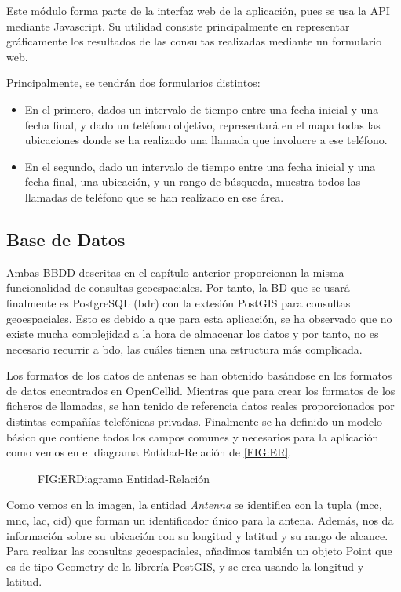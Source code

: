     Este módulo forma parte de la interfaz web de la aplicación, pues se usa la API mediante Javascript. Su utilidad consiste principalmente en representar gráficamente los resultados de las consultas realizadas mediante un formulario web.
    
    Principalmente, se tendrán dos formularios distintos:
    \begin{itemize}
      \item En el primero, dados un intervalo de tiempo entre una fecha inicial y una fecha final, y dado un teléfono objetivo, representará en el mapa todas las ubicaciones donde se ha realizado una llamada que involucre a ese teléfono.
      
      \item En el segundo, dado un intervalo de tiempo entre una fecha inicial y una fecha final, una ubicación, y un rango de búsqueda, muestra todos las llamadas de teléfono que se han realizado en ese área. 
    \end{itemize}
    
  \subsection{Base de Datos}
    Ambas BBDD descritas en el capítulo anterior proporcionan la misma funcionalidad de consultas geoespaciales.
    Por tanto, la BD que se usará finalmente es PostgreSQL (\ac{bdr}) con la extesión PostGIS para consultas geoespaciales. Esto es debido a que para esta aplicación, se ha observado que no existe mucha complejidad a la hora de almacenar los datos y por tanto, no es necesario recurrir a \ac{bdo}, las cuáles tienen una estructura más complicada. 

    Los formatos de los datos de antenas se han obtenido basándose en los formatos de datos encontrados en OpenCellid\cite{opencellid}.
    Mientras que para crear los formatos de los ficheros de llamadas, se han tenido de referencia datos reales proporcionados por distintas compañías telefónicas privadas.
    Finalmente se ha definido un modelo básico que contiene todos los campos comunes y necesarios para la aplicación como vemos en el diagrama Entidad-Relación de \ref{FIG:ER}.
    
    \begin{figure}[Diagrama Entidad-Relación]{FIG:ER}{Diagrama Entidad-Relación}
    \end{figure}
  
    Como vemos en la imagen, la entidad \textit{Antenna} se identifica con la tupla (mcc, mnc, lac, cid) que forman un identificador único para la antena. Además, nos da información sobre su ubicación con su longitud y latitud y su rango de alcance. Para realizar las consultas geoespaciales, añadimos también un objeto Point que es de tipo Geometry de la librería PostGIS, y se crea usando la longitud y latitud.
    

